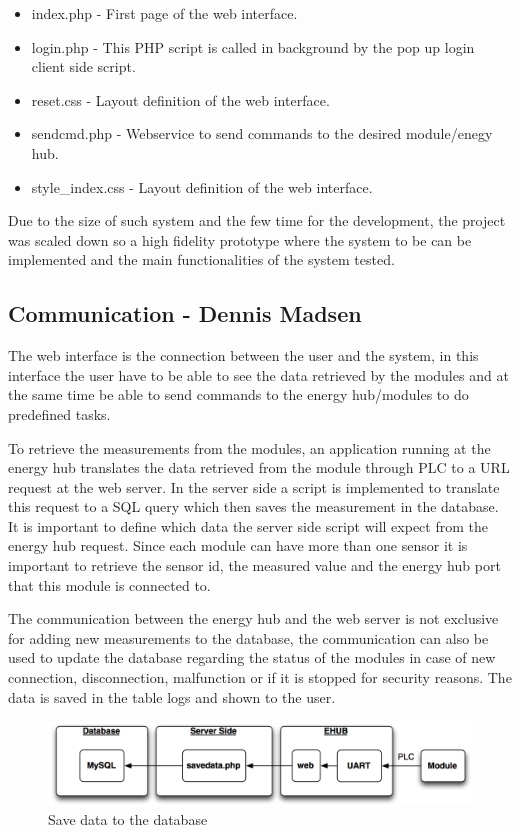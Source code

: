 \begin{itemize}
	\item index.php - First page of the web interface.
	\item login.php  - This PHP script is called in background by the pop up login client side script.
	\item reset.css - Layout definition of the web interface.
	\item sendcmd.php - Webservice to send commands to the desired module/enegy hub.
	\item style\_index.css - Layout definition of the web interface.
\end{itemize}

Due to the size of such system and the few time for the development, the project was scaled down so a high fidelity prototype where the system to be can be implemented and the main functionalities of the system tested.

\subsection{Communication - Dennis Madsen}
The web interface is the connection between the user and the system, in this interface the user have to be able to see the data retrieved by the modules and at the same time be able to send commands to the energy hub/modules to do predefined tasks.

To retrieve the measurements from the modules, an application running at the energy hub translates the data retrieved from the module through PLC to a URL request at the web server. In the server side a script is implemented to translate this request to a SQL query which then saves the measurement in the database. It is important to define which data the server side script will expect from the energy hub request. Since each module can have more than one sensor it is important to retrieve the sensor id, the measured value and the energy hub port that this module is connected to.

The communication between the energy hub and the web server is not exclusive for adding new measurements to the database, the communication can also be used to update the database regarding the status of the modules in case of new connection, disconnection, malfunction or if it is stopped for security reasons. The data is saved in the table logs and shown to the user.

\begin{figure}[H]
	\begin{centering}
		\includegraphics[width=1\textwidth]{images/savedata.png}
		\caption{Save data to the database}
	\end{centering}
\end{figure}

